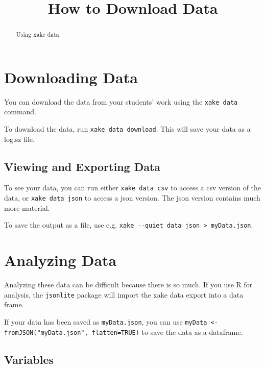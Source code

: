 \documentclass{ximera}
\title{How to Download Data}
\begin{document}
\begin{abstract}
  Using xake data.
\end{abstract}
\maketitle

\section{Downloading Data}

You can download the data from your students' work using the \verb!xake data! command.

To download the data, run \verb!xake data download!. This will save your data as a log.sz file.

\subsection{Viewing and Exporting Data}

To see your data, you can run either \verb!xake data csv! to access a csv version of the data, or \verb!xake data json! to access a json version. The json version contains much more material.

To save the output as a file, use e.g. \verb!xake --quiet data json > myData.json!.

\section{Analyzing Data}

Analyzing these data can be difficult because there is so much. If you use R for analysis, the \verb!jsonlite! package will import the xake data export into a data frame.

If your data has been saved as \verb!myData.json!, you can use \verb!myData <- fromJSON("myData.json", flatten=TRUE)! to save the data as a dataframe.

\subsection{Variables}
\end{document}

